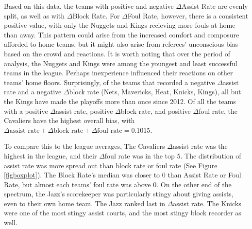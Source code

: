 \documentclass{article}
\begin{document}
Based on this data, the teams with positive and negative $\Delta$Assist Rate are evenly split, as well as with $\Delta$Block Rate. For $\Delta$Foul Rate, however, there is a consistent positive value, with only the Nuggets and Kings recieving more fouls at home than away. This pattern could arise from the increased comfort and composure afforded to home teams, but it might also arise from referees' unconscious bias based on the crowd and reactions. It is worth noting that over the period of analysis, the Nuggets and Kings were among the youngest and least successful teams in the league. Perhaps inexperience influenced their reactions on other teams' home floors. Surprisingly, of the teams that recorded a negative $\Delta$assist rate and a negative $\Delta$block rate (Nets, Mavericks, Heat, Knicks, Kings), all but the Kings have made the playoffs more than once since 2012. Of all the teams with a positive $\Delta$assist rate, positive $\Delta$block rate, and positive $\Delta$foul rate, the Cavaliers have the highest overall bias, with $\Delta \text{assist rate} + \Delta \text{block rate} + \Delta \text{foul rate} = 0.1015$.
\par To compare this to the league averages, The Cavaliers $\Delta$assist rate was the highest in the league, and their $\Delta$foul rate was in the top 5. The distribution of assist rate was more spread out than block rate or foul rate (See Figure \ref{figboxplot}). The Block Rate's median was closer to 0 than Assist Rate or Foul Rate, but almost each teams' foul rate was above 0. On the other end of the spectrum, the Jazz's scorekeeper was particularly stingy about giving assists, even to their own home team. The Jazz ranked last in $\Delta$assist rate. The Knicks were one of the most stingy assist courts, and the most stingy block recorder as well.
\end{document}

